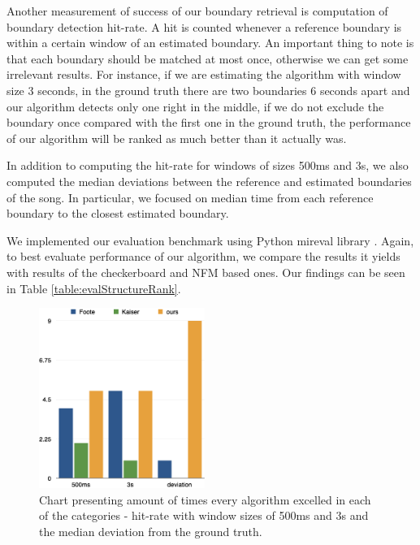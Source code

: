 Another measurement of success of our boundary retrieval is computation of boundary detection hit-rate. A hit is counted whenever a reference boundary is within a certain window of an estimated boundary. An important thing to note is that each boundary should be matched at most once, otherwise we can get some irrelevant results. For instance, if we are estimating the algorithm with window size 3 seconds, in the ground truth there are two boundaries 6 seconds apart and our algorithm detects only one right in the middle, if we do not exclude the boundary once compared with the first one in the ground truth, the performance of our algorithm will be ranked as much better than it actually was. 


In addition to computing the hit-rate for windows of sizes 500ms and 3s, we also computed the median deviations between the reference and estimated boundaries of the song. In particular, we focused on median time from each reference boundary to the closest estimated boundary.

We implemented our evaluation benchmark using Python mir\textunderscore eval library \cite{mireval}.
Again, to best evaluate performance of our algorithm, we compare the results it yields with results of the checkerboard and NFM based ones. Our findings can be seen in Table \ref{table:evalStructureRank}.


\begin{figure}
\vspace{-30pt}
  \begin{center}
    \includegraphics[width=0.48\textwidth]{Figures/structurechamps}
  \end{center}
  \caption{Chart presenting amount of times every algorithm excelled in each of the categories - hit-rate with window sizes of 500ms and 3s and the median deviation from the ground truth.}
\label{fig:structurechamps}
\end{figure}

